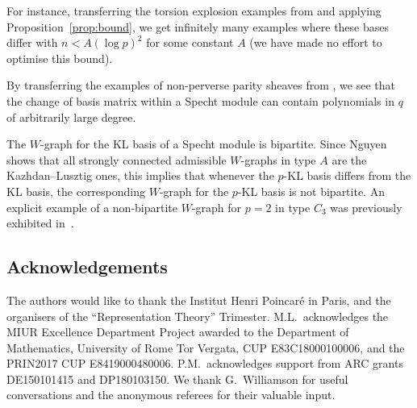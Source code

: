 \documentclass[pdftex]{sigma}
\numberwithin{equation}{section}
\begin{document}
For instance, transferring the torsion explosion examples from \cite{explosion} and applying Proposition~\ref{prop:bound}, we get infinitely many examples where these bases differ with $n<A(\log p)^2$ for some constant $A$ (we have made no effort to optimise this bound).

By transferring the examples of non-perverse parity sheaves from \cite{parity}, we see that the change of basis matrix within a Specht module can contain polynomials in $q$ of arbitrarily large degree.

The $W$-graph for the KL basis of a Specht module is bipartite. Since
Nguyen \cite[Theorem~9.8]{nguyen} shows that all strongly connected admissible $W$-graphs in type $A$ are the Kazhdan--Lusztig ones, this implies that whenever the $p$-KL basis differs from the KL basis, the corresponding $W$-graph for the $p$-KL basis is not bipartite. An explicit example of a non-bipartite $W$-graph for $p=2$ in type $C_3$ was previously exhibited in~\cite{thorge}.

\subsection*{Acknowledgements}
The authors would like to thank the Institut Henri Poincar\'e in Paris, and the organisers of the ``Representation Theory'' Trimester. M.L.~acknowledges the MIUR Excellence Department Project awarded to the Department of Mathematics, University of Rome Tor Vergata, CUP E83C18000100006, and the PRIN2017 CUP E8419000480006. P.M.~acknowledges support from ARC grants DE150101415 and DP180103150.
We thank G.~Williamson for useful conversations and the anonymous referees for their valuable input.
\end{document}
